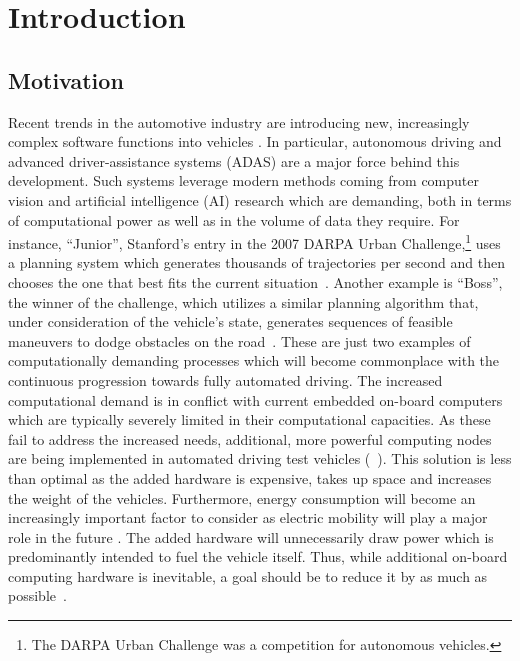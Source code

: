 
\chapter{Introduction}\label{chapter:introduction}

\section{Motivation}
Recent trends in the automotive industry are introducing new, increasingly complex software functions into vehicles \cite{broy2006challenges}. In particular, autonomous driving and advanced driver-assistance systems (ADAS) are a major force behind this development. Such systems leverage modern methods coming from computer vision and artificial intelligence (AI) research which are demanding, both in terms of computational power as well as in the volume of data they require. For instance, ``Junior'', Stanford’s
entry in the 2007 DARPA Urban Challenge,\footnote{The DARPA Urban Challenge was a competition for autonomous vehicles.} uses a planning system which generates thousands of trajectories per second and then chooses the one that best fits the current situation~\cite{levinson2011towards}. Another example is ``Boss'', the winner of the challenge, which utilizes a similar planning algorithm that, under consideration of the vehicle's state, generates sequences of feasible maneuvers to dodge obstacles on the road~\cite{urmson2009autonomous}. These are just two examples of computationally demanding processes which will become commonplace with the continuous progression towards fully automated driving.
The increased computational demand is in conflict with current embedded on-board computers which are typically severely limited in their computational capacities. As these fail to address the increased needs, additional, more powerful computing nodes are being implemented in automated driving test vehicles (\eg\ \cite{levinson2011towards, urmson2009autonomous, rauskolb2008caroline}). This solution is less than optimal as the added hardware is expensive, takes up space and increases the weight of the vehicles. Furthermore, energy consumption will become an increasingly important factor to consider as electric mobility will play a major role in the future \cite{festag2016studie}. The added hardware will unnecessarily draw power which is predominantly intended to fuel the vehicle itself. Thus, while additional on-board computing hardware is inevitable, a goal should be to reduce it by as much as possible~\cite{white2010r}.

